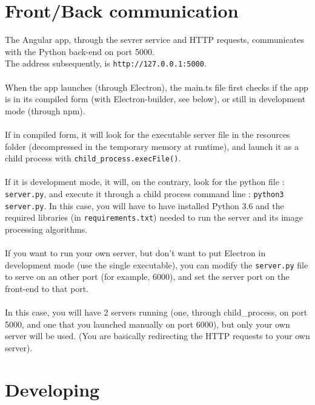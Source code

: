 \documentclass[12pt,a4paper]{article}
\begin{document}
\section{Front/Back communication}

The Angular app, through the sevrer service and HTTP requests, communicates with the Python back-end on port 5000.\\
The address subsequently, is \texttt{http://127.0.0.1:5000}.\\
~\\
When the app launches (through Electron), the main.ts file first checks if the app is in its compiled form (with Electron-builder, see below), or still in development mode (through npm).\\
~\\
If in compiled form, it will look for the executable server file in the resources folder (decompressed in the temporary memory at runtime), and launch it as a child process with \texttt{child\_process.execFile()}.\\
~\\
If it is development mode, it will, on the contrary, look for the python file : \texttt{server.py}, and execute it through a child process command line : \texttt{python3 server.py}. In this case, you will have to have installed Python 3.6 and the required libraries (in \texttt{requirements.txt}) needed to run the server and its image processing algorithms.\\
~\\
If you want to run your own server, but don't want to put Electron in development mode (use the single executable), you can modify the \texttt{server.py} file to serve on an other port (for example, 6000), and set the server port on the front-end to that port.\\
~\\
In this case, you will have 2 servers running (one, through child\_process, on port 5000, and one that you launched manually on port 6000), but only your own server will be used. (You are basically redirecting the HTTP requests to your own server).

\section{Developing}
\end{document}
